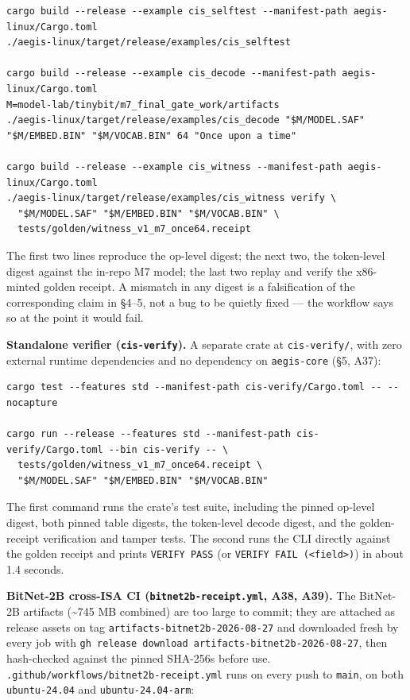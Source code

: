 \documentclass[11pt]{article}
\begin{document}
\begin{Verbatim}[breaklines=true,breakanywhere=true,fontsize=\small]
cargo build --release --example cis_selftest --manifest-path aegis-linux/Cargo.toml
./aegis-linux/target/release/examples/cis_selftest

cargo build --release --example cis_decode --manifest-path aegis-linux/Cargo.toml
M=model-lab/tinybit/m7_final_gate_work/artifacts
./aegis-linux/target/release/examples/cis_decode "$M/MODEL.SAF" "$M/EMBED.BIN" "$M/VOCAB.BIN" 64 "Once upon a time"

cargo build --release --example cis_witness --manifest-path aegis-linux/Cargo.toml
./aegis-linux/target/release/examples/cis_witness verify \
  "$M/MODEL.SAF" "$M/EMBED.BIN" "$M/VOCAB.BIN" \
  tests/golden/witness_v1_m7_once64.receipt
\end{Verbatim}

The first two lines reproduce the op-level digest; the next two, the
token-level digest against the in-repo M7 model; the last two replay and
verify the x86-minted golden receipt. A mismatch in any digest is a
falsification of the corresponding claim in §4--5, not a bug to be quietly
fixed --- the workflow says so at the point it would fail.

\textbf{Standalone verifier (\texttt{cis-verify}).} A separate crate at \texttt{cis-verify/}, with zero external
runtime dependencies and no dependency on \texttt{aegis-core} (§5, A37):

\begin{Verbatim}[breaklines=true,breakanywhere=true,fontsize=\small]
cargo test --features std --manifest-path cis-verify/Cargo.toml -- --nocapture

cargo run --release --features std --manifest-path cis-verify/Cargo.toml --bin cis-verify -- \
  tests/golden/witness_v1_m7_once64.receipt \
  "$M/MODEL.SAF" "$M/EMBED.BIN" "$M/VOCAB.BIN"
\end{Verbatim}

The first command runs the crate's test suite, including the pinned op-level digest, both pinned
table digests, the token-level decode digest, and the golden-receipt verification and tamper
tests. The second runs the CLI directly against the golden receipt and prints \texttt{VERIFY\ PASS} (or
\texttt{VERIFY\ FAIL\ (\textless{}field\textgreater{})}) in about 1.4 seconds.

\textbf{BitNet-2B cross-ISA CI (\texttt{bitnet2b-receipt.yml}, A38, A39).} The BitNet-2B artifacts (\textasciitilde745 MB
combined) are too large to commit; they are attached as release assets on tag
\texttt{artifacts-bitnet2b-2026-08-27} and downloaded fresh by every job with
\texttt{gh\ release\ download\ artifacts-bitnet2b-2026-08-27}, then hash-checked against the pinned
SHA-256s before use. \texttt{.github/workflows/bitnet2b-receipt.yml} runs on every push to \texttt{main}, on
both \texttt{ubuntu-24.04} and \texttt{ubuntu-24.04-arm}:
\end{document}
